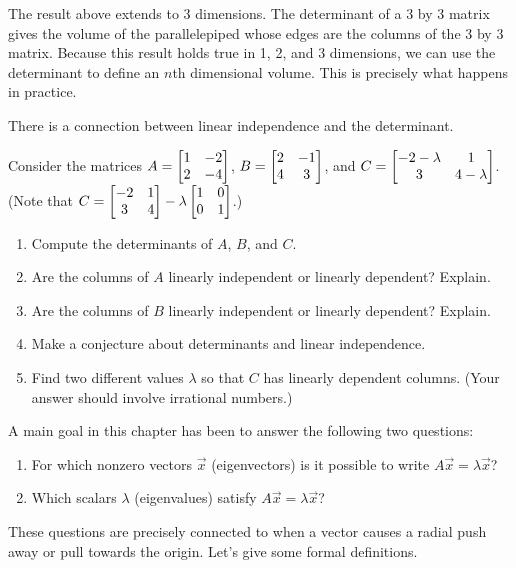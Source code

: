 The result above extends to 3 dimensions.  The determinant of a 3 by 3 matrix gives the volume of the parallelepiped whose edges are the columns of the 3 by 3 matrix. Because this result holds true in 1, 2, and 3 dimensions, we can use the determinant to define an $n$th dimensional volume. This is precisely what happens in practice. 




\mysubsection{\ideaeig}

There is a connection between linear independence and the determinant.


\begin{problem}
Consider the matrices $A=\begin{bmatrix} 1&-2\\2&-4 \end{bmatrix}$,  $B=\begin{bmatrix} 2&-1\\4&3 \end{bmatrix}$, and $C=\begin{bmatrix} -2-\lambda&1\\3&4-\lambda \end{bmatrix}$. (Note that $C = \begin{bmatrix} -2&1\\3&4 \end{bmatrix}-\lambda \begin{bmatrix} 1&0\\0&1 \end{bmatrix}$.)   
\begin{enumerate}
 \item Compute the determinants of $A$, $B$, and $C$. 
 \item Are the columns of $A$ linearly independent or linearly dependent? Explain.  
 \item Are the columns of $B$ linearly independent or linearly dependent? Explain.
 \item Make a conjecture about determinants and linear independence.  
 \item Find two different values $\lambda$ so that $C$ has linearly dependent columns. (Your answer should involve irrational numbers.)
\end{enumerate}
\end{problem}


A main goal in this chapter has been to answer the following two questions:
\begin{enumerate}
 \item For which nonzero vectors $\vec x$ (eigenvectors) is it possible to write $A\vec x = \lambda \vec x$?
 \item Which scalars $\lambda$ (eigenvalues) satisfy $A\vec x = \lambda \vec x$?
\end{enumerate}
These questions are precisely connected to when a vector causes a radial push away or pull towards the origin. 
Let's give some formal definitions.



